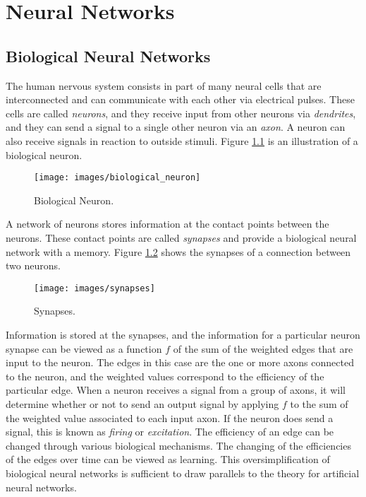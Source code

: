 \chapter[Neural Networks]{Neural Networks}

\section{Biological Neural Networks}

The human nervous system consists in part of many neural cells that are interconnected and can communicate with each other via electrical pulses.
These cells are called {\it neurons}, and they receive input from other neurons via {\it dendrites}, and they can send a signal to a single other neuron via an {\it axon}.
A neuron can also receive signals in reaction to outside stimuli.
Figure \ref{biological_neuron} is an illustration of a biological neuron. 

\begin{figure}[htb!]
  \centering
  \texttt{[image: images/biological\_neuron]}
  \caption{Biological Neuron.}
  \label{biological_neuron}
\end{figure}

A network of neurons stores information at the contact points between the neurons.
These contact points are called {\it synapses} and provide a biological neural network with a memory.
Figure \ref{synapses} shows the synapses of a connection between two neurons.

\begin{figure}[htb!]
  \centering
  \texttt{[image: images/synapses]}
  \caption{Synapses.}
  \label{synapses}
\end{figure}

Information is stored at the synapses, and the information for a particular neuron synapse can be viewed as a function $f$ of the sum of the weighted edges that are input to the neuron.
The edges in this case are the one or more axons connected to the
neuron, and the weighted values correspond to the efficiency of the particular edge. 
When a neuron receives a signal from a group of axons, it will determine whether or not to send an output signal by applying $f$ to the sum of the weighted value associated to each input axon.
If the neuron does send a signal, this is known as {\it firing} or {\it excitation}.
The efficiency of an edge can be changed through various biological mechanisms.
The changing of the efficiencies of the edges over time can be viewed as learning.
This oversimplification of biological neural networks is sufficient to draw parallels to the theory for artificial neural networks.

